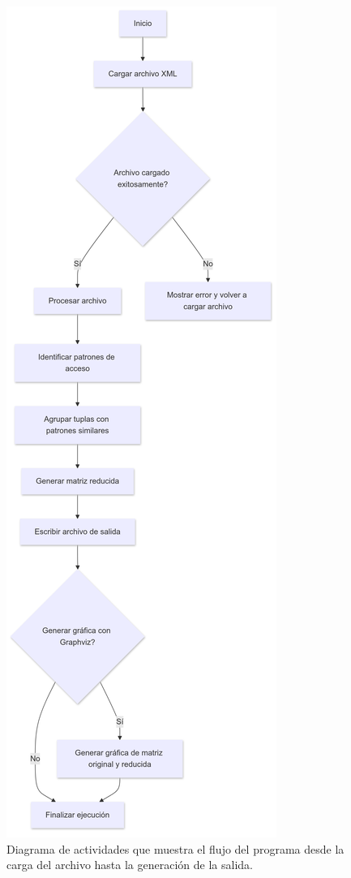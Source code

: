 \documentclass[letterpaper,12pt]{article}
\begin{document}
\begin{multicols}{2}
    \begin{figure}[H]
        \centering
        \includegraphics[width=\columnwidth]{images/activity_diagram.png}
        \caption{Diagrama de actividades que muestra el flujo del programa desde la carga del archivo hasta la generación de la salida.}
    \end{figure}


\end{multicols}
\end{document}
